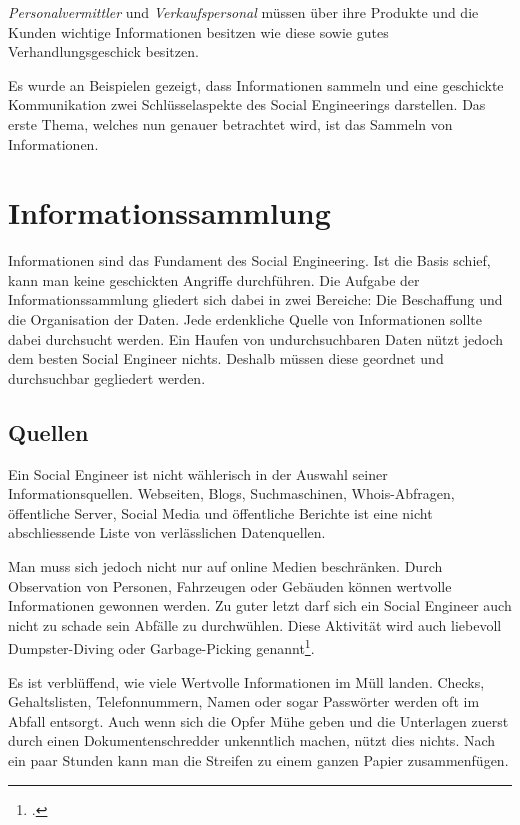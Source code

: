 \textit{Personalvermittler} und \textit{Verkaufspersonal} müssen über ihre Produkte und die Kunden wichtige Informationen besitzen wie diese sowie gutes Verhandlungsgeschick besitzen.

Es wurde an Beispielen gezeigt, dass Informationen sammeln und eine geschickte Kommunikation zwei Schlüsselaspekte des Social Engineerings darstellen. Das erste Thema, welches nun genauer betrachtet wird, ist das Sammeln von Informationen.

\section{Informationssammlung}
Informationen sind das Fundament des Social Engineering. Ist die Basis schief, kann man keine geschickten Angriffe durchführen. Die Aufgabe der Informationssammlung gliedert sich dabei in zwei Bereiche: Die Beschaffung und die Organisation der Daten. Jede erdenkliche Quelle von Informationen sollte dabei durchsucht werden. Ein Haufen von undurchsuchbaren Daten nützt jedoch dem besten Social Engineer nichts. Deshalb müssen diese geordnet und durchsuchbar gegliedert werden.

\subsection{Quellen}
Ein Social Engineer ist nicht wählerisch in der Auswahl seiner Informationsquellen. Webseiten, Blogs, Suchmaschinen, Whois-Abfragen, öffentliche Server, Social Media und öffentliche Berichte ist eine nicht abschliessende Liste von verlässlichen Datenquellen. 

Man muss sich jedoch nicht nur auf online Medien beschränken. Durch Observation von Personen, Fahrzeugen oder Gebäuden können wertvolle Informationen gewonnen werden. Zu guter letzt darf sich ein Social Engineer auch nicht zu schade sein Abfälle zu durchwühlen. Diese Aktivität wird auch liebevoll Dumpster-Diving oder Garbage-Picking genannt\footcite{human_hacking}. 

Es ist verblüffend, wie viele Wertvolle Informationen im Müll landen. Checks, Gehaltslisten, Telefonnummern, Namen oder sogar Passwörter werden oft im Abfall entsorgt. Auch wenn sich die Opfer Mühe geben und die Unterlagen zuerst durch einen Dokumentenschredder unkenntlich machen, nützt dies nichts. Nach ein paar Stunden kann man die Streifen zu einem ganzen Papier zusammenfügen. 


